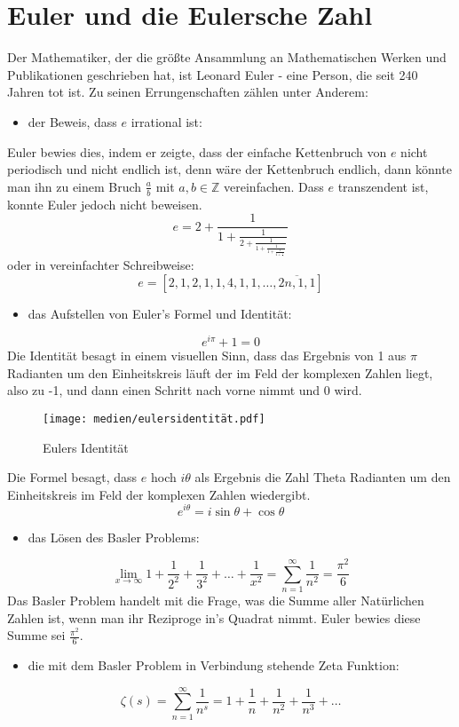 \section{Euler und die Eulersche Zahl}
Der Mathematiker, der die größte Ansammlung an Mathematischen Werken und Publikationen geschrieben hat, ist Leonard Euler - eine Person, die seit 240 Jahren tot ist. Zu seinen Errungenschaften zählen unter Anderem: 
\begin{itemize}
  \item der Beweis, dass $e$ irrational ist:
\end{itemize}
Euler bewies dies, indem er zeigte, dass der einfache Kettenbruch von $e$ nicht periodisch und nicht endlich ist, denn wäre der Kettenbruch endlich, dann könnte man ihn zu einem Bruch $\frac{a}{b}$ mit $a,b \in \mathbb{Z}$ vereinfachen. Dass $e$ transzendent ist, konnte Euler jedoch nicht beweisen. \[
e = 2 +\frac{1}{1 + \frac{1}{2 + \frac{1}{1 + \frac{1}{1 + \frac{1}{4 + \frac{1}{\ddots}}}}}} \] 
oder in vereinfachter Schreibweise: \[
e = [2,1,2,1,1,4,1,1,\dots,\overline{2n,1,1}] \]
\begin{itemize}
  \item das Aufstellen von Euler's Formel und Identität:
\end{itemize}\[
e^{i\pi} + 1 = 0 \]
Die Identität besagt in einem visuellen Sinn, dass das Ergebnis von 1 aus $\pi$ Radianten um den Einheitskreis läuft der im Feld der komplexen Zahlen liegt, also zu -1, und dann einen Schritt nach vorne nimmt und 0 wird.
\begin{figure}[h]
\texttt{[image: medien/eulersidentität.pdf]}
\centering
\caption{Eulers Identität}
\end{figure}
\newpage
\par Die Formel besagt, dass $e$ hoch $i\theta$ als Ergebnis die Zahl Theta Radianten um den Einheitskreis im Feld der komplexen Zahlen wiedergibt.
\[ e^{i\theta} = i\sin{\theta} + \cos{\theta} \] 
\begin{itemize}
  \item das Lösen des Basler Problems:
\end{itemize} \[
\lim_{x\to\infty} 1 + \frac{1}{2^2} + \frac{1}{3^2} + \dots + \frac{1}{x^2} = \sum_{n=1}^{\infty} \frac{1}{n^2} = \frac{\pi^2}{6}\]
Das Basler Problem handelt mit die Frage, was die Summe aller Natürlichen Zahlen ist, wenn man ihr Reziproge in's Quadrat nimmt. Euler bewies diese Summe sei $\frac{\pi^2}{6}$.
\begin{itemize}
  \item die mit dem Basler Problem in Verbindung stehende Zeta Funktion:
\end{itemize} \[
\zeta(s) = \sum_{n=1}^{\infty} \frac{1}{n^s} = 1 + \frac{1}{n} + \frac{1}{n^2} + \frac{1}{n^3} + \dots \]

